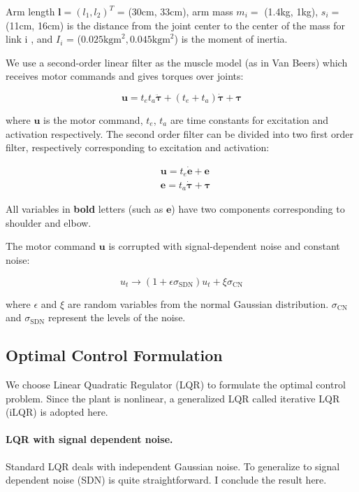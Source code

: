 Arm length $\bm{l} = (l_1, l_2)^T$ = (30cm, 33cm), arm mass $m_i =$ (1.4kg, 1kg), $s_i=$ (11cm, 16cm) is the distance from the joint center to the center of the mass for link i , and $I_i$ = ($0.025\text{kgm}^2, 0.045\text{kgm}^2$) is the moment of inertia.

We use a second-order linear filter as the muscle model (as in Van Beers) which receives motor commands and gives torques over joints:

\begin{equation}
\bm{u} = t_et_a\ddot{\bm{\tau}} + (t_e+t_a)\dot{\bm{\tau}} +\bm{\tau}
\end{equation}

where $\bm{u}$ is the motor command, $t_e$, $t_a$ are time constants for excitation and activation respectively. 
The second order filter can be divided into two first order filter, respectively corresponding to excitation and activation:

\begin{equation}
\begin{split}
& \bm{u} = t_e \dot{\bm{e}} + \bm{e} \\
& \bm{e} = t_a \dot{\bm{\tau}} + \bm{\tau}
\end{split}
\end{equation}

All variables in \textbf{bold} letters (such as $\bm{e}$) have two components corresponding to shoulder and elbow.

The motor command $\bm{u}$ is corrupted with signal-dependent noise and constant noise:

\begin{equation}
u_t \rightarrow (1 + \epsilon\sigma_{\text{SDN}}) u_t + \xi\sigma_{\text{CN}}
\end{equation}

where $\epsilon$ and $\xi$ are random variables from the normal Gaussian distribution.
$\sigma_{\text{CN}}$ and $\sigma_{\text{SDN}}$ represent the levels of the noise.

\subsection{Optimal Control Formulation}
\label{ocformulation}

We choose Linear Quadratic Regulator (LQR) \cite{Li2004} to formulate the optimal control problem. Since the plant is nonlinear, a generalized LQR called iterative LQR (iLQR) is adopted here.

\paragraph{LQR with signal dependent noise.}
Standard LQR deals with independent Gaussian noise. To generalize to signal dependent noise (SDN) is quite straightforward. I conclude the result here.


